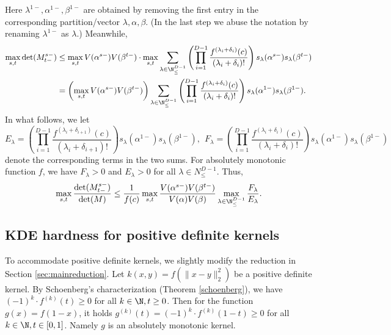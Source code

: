 Here $\lambda^{1-}, \alpha^{1-}, \beta^{1-}$ are obtained by removing the first entry in the corresponding partition/vector $\lambda, \alpha, \beta$.
(In the last step we abuse the notation by renaming $\lambda^{1-}$ as $\lambda$.) Meanwhile,
\begin{align*}
\max_{s, t}\det(M_{t-}^{s-}) &\le \max_{s, t} V(\alpha^{s-})V(\beta^{t-}) \cdot
\max_{s, t} \sum_{\lambda \in \N^{D-1}_{\le}}
\left(\prod_{i=1}^{D-1} \frac{f^{(\lambda_i + \delta_i)}(c)}{(\lambda_i + \delta_i)!}\right)
s_{\lambda}(\alpha^{s-})s_{\lambda}(\beta^{t-}) \\
&= \left(\max_{s, t} V(\alpha^{s-})V(\beta^{t-})\right)
\sum_{\lambda \in \N^{D-1}_{\le}}
\left(\prod_{i=1}^{D-1} \frac{f^{(\lambda_i + \delta_i)}(c)}{(\lambda_i + \delta_i)!}\right)
s_{\lambda}(\alpha^{1-})s_{\lambda}(\beta^{1-}).
\end{align*}
In what follows, we let
\[E_\lambda = \left(\prod_{i=1}^{D-1} 
\frac{f^{(\lambda_i + \delta_{i+1})}(c)}{(\lambda_i + \delta_{i+1})!}\right)
s_{\lambda}(\alpha^{1-})s_{\lambda}(\beta^{1-}), ~~
F_\lambda = \left(\prod_{i=1}^{D-1} 
\frac{f^{(\lambda_i + \delta_i)}(c)}{(\lambda_i + \delta_i)!}\right)
s_{\lambda}(\alpha^{1-})s_{\lambda}(\beta^{1-})\]
denote the corresponding terms in the two sums. For absolutely monotonic function $f$, we have $F_\lambda > 0$ and $E_{\lambda} > 0$ for all $\lambda \in N^{D-1}_{\le}$. Thus,
\begin{equation}
\label{eq:detRatio}
\max_{s, t} \frac{\det(M^{s-}_{t-})}{\det(M)}
\le \frac 1{f(c)} \max_{s, t} \frac{V(\alpha^{s-})V(\beta^{t-})}{V(\alpha)V(\beta)}
\max_{\lambda \in \N^{D-1}_{\le}}\frac{F_\lambda}{E_\lambda}.
\end{equation}

\subsection{KDE hardness for positive definite kernels} \label{sec:pdkde}
To accommodate positive definite kernels, we slightly modify the reduction in Section \ref{sec:mainreduction}.
Let $k(x, y) = f(\|x-y\|_2^2)$ be a positive definite kernel. By Schoenberg's characterization (Theorem \ref{schoenberg}), we have $(-1)^k \cdot f^{(k)}(t) \ge 0$ for all $k \in \N, t \ge 0$. Then for the function $g(x) = f(1-x)$, it holds $g^{(k)}(t) = (-1)^k \cdot f^{(k)}(1-t) \ge 0$ for all $k \in \N, t \in [0, 1]$.
Namely $g$ is an absolutely monotonic kernel. 

